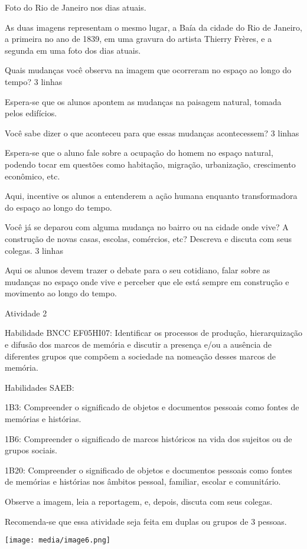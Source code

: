 Foto do Rio de Janeiro nos dias atuais.

As duas imagens representam o mesmo lugar, a Baía da cidade do Rio de
Janeiro, a primeira no ano de 1839, em uma gravura do artista Thierry
Frères, e a segunda em uma foto dos dias atuais.

Quais mudanças você observa na imagem que ocorreram no espaço ao longo
do tempo? 3 linhas

Espera-se que os alunos apontem as mudanças na paisagem natural, tomada
pelos edifícios.

Você sabe dizer o que aconteceu para que essas mudanças acontecessem? 3
linhas

Espera-se que o aluno fale sobre a ocupação do homem no espaço natural,
podendo tocar em questões como habitação, migração, urbanização,
crescimento econômico, etc.

Aqui, incentive os alunos a entenderem a ação humana enquanto
transformadora do espaço ao longo do tempo.

Você já se deparou com alguma mudança no bairro ou na cidade onde vive?
A construção de novas casas, escolas, comércios, etc? Descreva e discuta
com seus colegas. 3 linhas

Aqui os alunos devem trazer o debate para o seu cotidiano, falar sobre
as mudanças no espaço onde vive e perceber que ele está sempre em
construção e movimento ao longo do tempo.

Atividade 2

Habilidade BNCC EF05HI07: Identificar os processos de produção,
hierarquização e difusão dos marcos de memória e discutir a presença
e/ou a ausência de diferentes grupos que compõem a sociedade na nomeação
desses marcos de memória.

Habilidades SAEB:

1B3: Compreender o significado de objetos e documentos pessoais como
fontes de memórias e histórias.

1B6: Compreender o significado de marcos históricos na vida dos sujeitos
ou de grupos sociais.

1B20: Compreender o significado de objetos e documentos pessoais como
fontes de memórias e histórias nos âmbitos pessoal, familiar, escolar e
comunitário.

Observe a imagem, leia a reportagem, e, depois, discuta com seus
colegas.

Recomenda-se que essa atividade seja feita em duplas ou grupos de 3
pessoas.

\texttt{[image: media/image6.png]}

